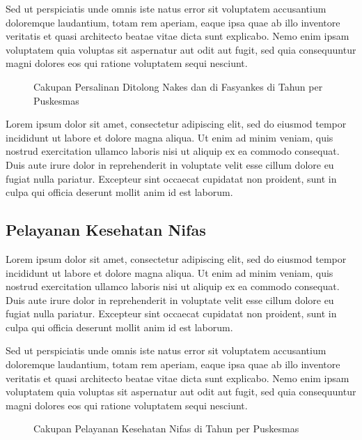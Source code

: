 Sed ut perspiciatis unde omnis iste natus error sit voluptatem accusantium doloremque laudantium, totam rem aperiam, eaque ipsa quae ab illo inventore veritatis et quasi architecto beatae vitae dicta sunt explicabo. Nemo enim ipsam voluptatem quia voluptas sit aspernatur aut odit aut fugit, sed quia consequuntur magni dolores eos qui ratione voluptatem sequi nesciunt.

\begin{figure}[H]
    \centering
    \caption{Cakupan Persalinan Ditolong Nakes dan di Fasyankes di \namaKabupaten Tahun \tP per Puskesmas}
    \label{fig:Cakupan-Persalinan-Ditolong-Nakes-Fasyankes}
\end{figure}

Lorem ipsum dolor sit amet, consectetur adipiscing elit, sed do eiusmod tempor incididunt ut labore et dolore magna aliqua. Ut enim ad minim veniam, quis nostrud exercitation ullamco laboris nisi ut aliquip ex ea commodo consequat. Duis aute irure dolor in reprehenderit in voluptate velit esse cillum dolore eu fugiat nulla pariatur. Excepteur sint occaecat cupidatat non proident, sunt in culpa qui officia deserunt mollit anim id est laborum.

\subsection{Pelayanan Kesehatan Nifas}
Lorem ipsum dolor sit amet, consectetur adipiscing elit, sed do eiusmod tempor incididunt ut labore et dolore magna aliqua. Ut enim ad minim veniam, quis nostrud exercitation ullamco laboris nisi ut aliquip ex ea commodo consequat. Duis aute irure dolor in reprehenderit in voluptate velit esse cillum dolore eu fugiat nulla pariatur. Excepteur sint occaecat cupidatat non proident, sunt in culpa qui officia deserunt mollit anim id est laborum.

Sed ut perspiciatis unde omnis iste natus error sit voluptatem accusantium doloremque laudantium, totam rem aperiam, eaque ipsa quae ab illo inventore veritatis et quasi architecto beatae vitae dicta sunt explicabo. Nemo enim ipsam voluptatem quia voluptas sit aspernatur aut odit aut fugit, sed quia consequuntur magni dolores eos qui ratione voluptatem sequi nesciunt.

\begin{figure}[H]
    \centering{}
    \caption{Cakupan Pelayanan Kesehatan Nifas di \namaKabupaten Tahun \tP per Puskesmas}
    \label{fig:Cakupan-Yankes-Nifas}
\end{figure}

